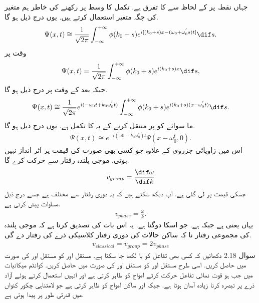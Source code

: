  جہاں نقطہ  پر  کے لحاظ سے  کا تفرق  ہے. 
 تکمل کا وسط  پر رکھنے کی خاطر ہم متغیر  کی جگہ متغیر  استعمال کرتے ہیں. یوں درج ذیل ہو گا. 
\begin{align*}
\Psi (x,t) \cong \frac{1}{\sqrt{2 \pi }} \int_{- \infty}^{+ \infty} \phi (k_{0} + s) e^{i[(k_{0} +s)x-(\omega_{0} + \omega_{0}^{'}s )t]} \dif s.
\end{align*}
 وقت   پر 
\begin{align*}
\Psi (x,t) = \frac{1}{\sqrt{2 \pi }} \int_{- \infty}^{+ \infty} \phi (k_{0} + s) e^{i(k_{0} +s)x} \dif s,
\end{align*}
 جبکہ بعد کے وقت پر درج ذیل ہو گا. 
\begin{align*}
\Psi (x,t) \cong \frac{1}{\sqrt{2 \pi}} e^{i(-\omega_{0}t+k_{0}\omega_{0}^{'}t)} \int_{-\infty}^{+\infty} \phi (k_{0} + s) e^{i(k_{0} + s ) ( x - \omega_{0}^{'}t)} \dif s.
\end{align*}
 ما سوائے   کو  پر منتقل کرنے کے یہ  کا تکمل ہے. یوں درج ذیل ہو گا. 
\begin{align}
\Psi(x,t) \cong e^{-i(\omega{0} - k_{0} \omega_{0}^{'})t} \Psi(x-\omega_{0}^{t},0).
\end{align}
 اس میں زاویائی جزروی کے علاوہ جو کسی بھی صورت   کی قیمت پر اثر انداز نہیں ہوتی, موجی پلندہ رفتار  سے حرکت کرے گا. 
\begin{align}
v_{group} = \frac{\dif \omega}{\dif k}
\end{align}
 جسکی قیمت  پر لی گئی ہے. آپ دیکھ سکتے ہیں کہ یہ دوری رفتار سے مختلف ہے جسے درج ذیل مساوات پیش کرتی ہے. 
\begin{align}
v_{phase} = \frac{\omega}{k}.
\end{align}
 یہاں   یعنی  ہے جبکہ  ہے. جو اسکا دوگنا ہے. یہ اس بات کی تصدیق کرتا ہے کہ موجی پلندہ کی مجموعی رفتار نا کہ ساکن حالات کی دوری رفتار کلاسیکی ذرے کی رفتار دے گی. 
\begin{align}
v_{classical} = v_{group} = 2v_{phase}
\end{align}
سوال 2.18
دکھائیں کہ  کسی بھی تفاعل کو  یا   لکھا جا سکتا ہے. مستقل  اور   کو مستقل   اور  کی صورت میں حاصل کریں. اسی طرح مستقل  اور   کو مستقل   اور  کی صورت میں حاصل کریں. کوانٹم میکانیات میں جب   ہو قوت نمائی تفاعل حرکت کرتے امواج کو ظاہر کرتی ہے اور انہیں استعمال کرتے ہوئے آزاد ذرے پر تبصرہ کرنا زیادہ آسان ہوتا ہے. جبکہ   اور   ساکن امواج کو ظاہر کرتی ہے جو لامتناہی چکور کنواں میں قدرتی طور پر پیدا ہوتی ہے. 
